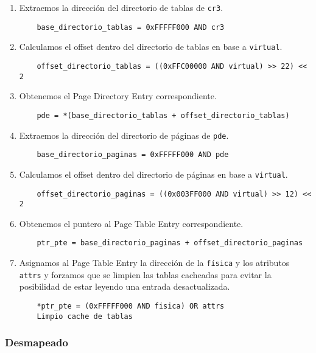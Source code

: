 \begin{enumerate}
	\item Extraemos la dirección del directorio de tablas de \texttt{cr3}.
	\begin{lstlisting}
	base_directorio_tablas = 0xFFFFF000 AND cr3
	\end{lstlisting}

	\item Calculamos el offset dentro del directorio de tablas en base a
	\texttt{virtual}.
	\begin{lstlisting}
	offset_directorio_tablas = ((0xFFC00000 AND virtual) >> 22) << 2
	\end{lstlisting}

	\item Obtenemos el Page Directory Entry correspondiente.
	\begin{lstlisting}
	pde = *(base_directorio_tablas + offset_directorio_tablas)
	\end{lstlisting}

	\item Extraemos la dirección del directorio de páginas de \texttt{pde}.
	\begin{lstlisting}
	base_directorio_paginas = 0xFFFFF000 AND pde
	\end{lstlisting}

	\item Calculamos el offset dentro del directorio de páginas en base a
	\texttt{virtual}.
	\begin{lstlisting}
	offset_directorio_paginas = ((0x003FF000 AND virtual) >> 12) << 2
	\end{lstlisting}

	\item Obtenemos el puntero al Page Table Entry correspondiente.
	\begin{lstlisting}
	ptr_pte = base_directorio_paginas + offset_directorio_paginas
	\end{lstlisting}

	\item Asignamos al Page Table Entry la dirección de la \texttt{física} y los
	atributos \texttt{attrs} y forzamos que se limpien las tablas cacheadas para
	evitar la posibilidad de estar leyendo una entrada desactualizada.
	\begin{lstlisting}
	*ptr_pte = (0xFFFFF000 AND fisica) OR attrs
	Limpio cache de tablas
	\end{lstlisting}
\end{enumerate}

\subsubsection*{Desmapeado}

